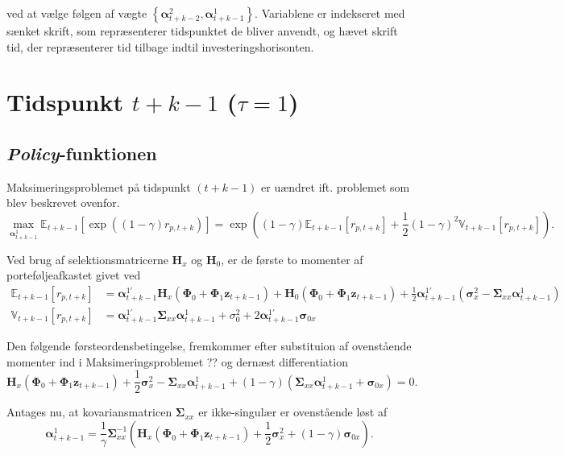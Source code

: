 \documentclass[
  a4paper,
  oneside]{memoir}
\begin{document}
ved at vælge følgen af vægte \(\left\{\bm{\alpha}_{t+k-2}^2, \bm{\alpha}_{t+k-1}^1\right\}\). Variablene er indekseret med sænket skrift, som repræsenterer tidspunktet de bliver anvendt, og hævet skrift tid, der repræsenterer tid tilbage indtil investeringshorisonten.

\hypertarget{tidspunkt-tk-1-tau1}{%
\section{\texorpdfstring{Tidspunkt \(t+k-1\) (\(\tau=1\))}{Tidspunkt t+k-1 (\textbackslash tau=1)}}\label{tidspunkt-tk-1-tau1}}

\hypertarget{policy-funktionen}{%
\subsection{\texorpdfstring{\emph{Policy}-funktionen}{Policy-funktionen}}\label{policy-funktionen}}

Maksimeringsproblemet på tidspunkt \((t+k-1)\) er uændret ift. problemet som blev beskrevet ovenfor.
\[\max_{\bm{\alpha}_{t+k-1}^1} \mathbb{E}_{t+k-1}\left[\exp((1-\gamma)r_{p,t+k})\right] = \exp\left((1-\gamma) \mathbb{E}_{t+k-1}\left[r_{p,t+k}\right]+\frac{1}{2}(1-\gamma)^2 \mathbb{V}_{t+k-1}\left[r_{p,t+k}\right]\right).\]

Ved brug af selektionsmatricerne \(\bm{H}_x\) og \(\bm{H}_0\), er de første to momenter af porteføljeafkastet givet ved
\begin{align*}
\mathbb{E}_{t+k-1}\left[r_{p,t+k}\right]&= \bm{\alpha}_{t+k-1}^{1\prime} \bm{H}_x (\bm{\Phi}_0 +\bm{\Phi}_1\bm{z}_{t+k-1}) + \bm{H}_0(\bm{\Phi}_0 +\bm{\Phi}_1\bm{z}_{t+k-1})+\frac{1}{2} \bm{\alpha}_{t+k-1}^{1\prime} (\bm{\sigma}_x^2-\bm{\Sigma}_{xx}\bm{\alpha}_{t+k-1}^{1})\\
\mathbb{V}_{t+k-1}[r_{p,t+k}]&=\bm{\alpha}_{t+k-1}^{1\prime}\bm{\Sigma}_{xx}\bm{\alpha}_{t+k-1}^{1}+ \sigma_0^2 + 2\bm{\alpha}_{t+k-1}^{1\prime}\bm{\sigma}_{0x}
\end{align*}

Den følgende førsteordensbetingelse, fremkommer efter substituion af ovenstående momenter ind i Maksimeringsproblemet ?? og dernæst differentiation
\[\bm{H}_x(\bm{\Phi}_0 +\bm{\Phi}_1\bm{z}_{t+k-1})+\frac{1}{2}\bm{\sigma}_x^2 - \bm{\Sigma}_{xx} \bm{\alpha}_{t+k-1}^{1}+(1-\gamma) (\bm{\Sigma}_{xx}\bm{\alpha}_{t+k-1}^{1}+\bm{\sigma}_{0x})=0.\]

Antages nu, at kovariansmatricen \(\bm{\Sigma}_{xx}\) er ikke-singulær er ovenstående løst af
\[\bm{\alpha}_{t+k-1}^{1}=\frac{1}{\gamma}\bm{\Sigma}_{xx}^{-1}\left(\bm{H}_x(\bm{\Phi}_0 +\bm{\Phi}_1\bm{z}_{t+k-1})+\frac{1}{2}\bm{\sigma}_x^2+(1-\gamma) \bm{\sigma}_{0x}\right).\]
\end{document}
